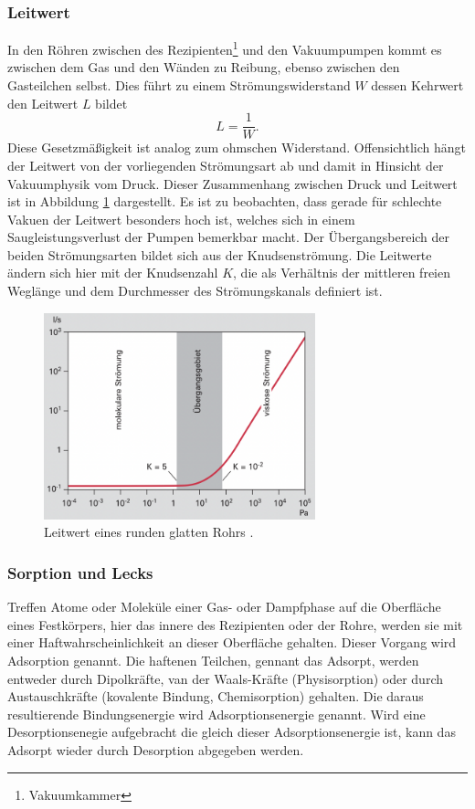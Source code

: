 \subsubsection{Leitwert}
In den Röhren zwischen des Rezipienten\footnote{Vakuumkammer} und den Vakuumpumpen kommt es zwischen dem Gas 
und den Wänden zu Reibung, ebenso zwischen den Gasteilchen selbst.
Dies führt zu einem Strömungswiderstand $W$ dessen Kehrwert den Leitwert $L$ bildet
\begin{equation}
    L = \frac{1}{W}.
\end{equation}
Diese Gesetzmäßigkeit ist analog zum ohmschen Widerstand.
Offensichtlich hängt der Leitwert von der vorliegenden Strömungsart ab
und damit in Hinsicht der Vakuumphysik vom Druck.
Dieser Zusammenhang zwischen Druck und Leitwert ist in Abbildung \ref{fig:leitwert} dargestellt.
Es ist zu beobachten, dass gerade für schlechte Vakuen der Leitwert besonders hoch ist,
welches sich in einem Saugleistungsverlust der Pumpen bemerkbar macht.
Der Übergangsbereich der beiden Strömungsarten bildet sich aus der Knudsenströmung.
Die Leitwerte ändern sich hier mit der Knudsenzahl $K$,
die als Verhältnis der mittleren freien Weglänge und dem Durchmesser des Strömungskanals definiert ist.
\begin{figure}[h]
    \centering
    \includegraphics[width=0.7\textwidth]{abb/leitwert.png}
    \caption{Leitwert eines runden glatten Rohrs \cite{Pfeifer}.} 
    \label{fig:leitwert}
\end{figure} 

\subsubsection{Sorption und Lecks}
Treffen Atome oder Moleküle einer Gas- oder Dampfphase auf die Oberfläche eines Festkörpers, hier das innere des Rezipienten oder der Rohre, werden sie mit einer Haftwahrscheinlichkeit an dieser Oberfläche gehalten.
Dieser Vorgang wird Adsorption genannt. Die haftenen Teilchen, gennant das Adsorpt, werden entweder durch Dipolkräfte, van der Waals-Kräfte (Physisorption) oder durch Austauschkräfte (kovalente Bindung, Chemisorption) gehalten.
Die daraus resultierende Bindungsenergie wird Adsorptionsenergie genannt. Wird eine Desorptionsenegie aufgebracht die gleich dieser Adsorptionsenergie ist, kann das Adsorpt wieder durch Desorption abgegeben werden.

